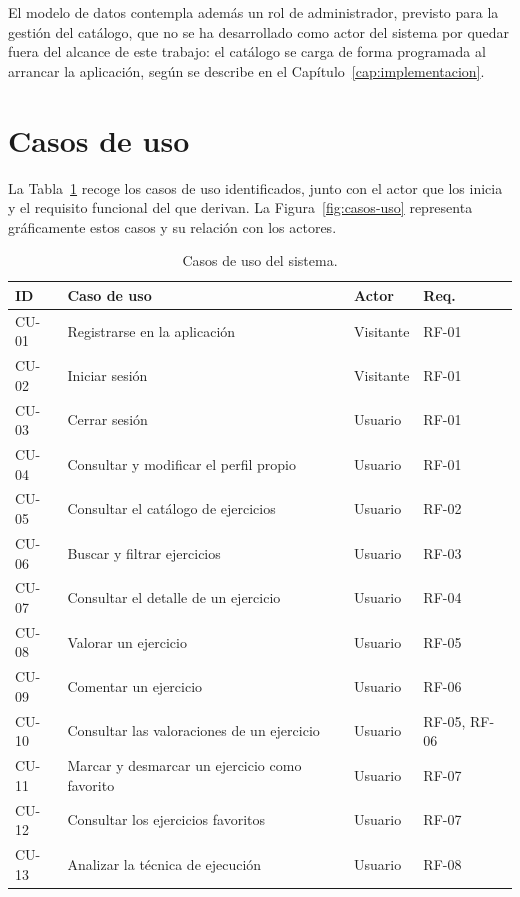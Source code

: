 \documentclass[12pt,a4paper,twoside,openright]{book}
\begin{document}
    El modelo de datos contempla además un rol de administrador, previsto para
    la gestión del catálogo, que no se ha desarrollado como actor del sistema
    por quedar fuera del alcance de este trabajo: el catálogo se carga de forma
    programada al arrancar la aplicación, según se describe en el
    Capítulo~\ref{cap:implementacion}.

    \section{Casos de uso}

    La Tabla~\ref{tab:casos-uso} recoge los casos de uso identificados, junto
    con el actor que los inicia y el requisito funcional del que derivan. La 
    Figura~\ref{fig:casos-uso} representa gráficamente estos casos y su relación con los actores.

    \begin{table}[htbp]
        \centering
        \small
        \begin{tabular}{l p{6.5cm} l l}
            \toprule
            \textbf{ID} & \textbf{Caso de uso} & \textbf{Actor} & \textbf{Req.} \\
            \midrule
            CU-01 & Registrarse en la aplicación            & Visitante & RF-01 \\
            CU-02 & Iniciar sesión                          & Visitante & RF-01 \\
            CU-03 & Cerrar sesión                           & Usuario   & RF-01 \\
            CU-04 & Consultar y modificar el perfil propio  & Usuario   & RF-01 \\
            CU-05 & Consultar el catálogo de ejercicios     & Usuario   & RF-02 \\
            CU-06 & Buscar y filtrar ejercicios             & Usuario   & RF-03 \\
            CU-07 & Consultar el detalle de un ejercicio    & Usuario   & RF-04 \\
            CU-08 & Valorar un ejercicio                    & Usuario   & RF-05 \\
            CU-09 & Comentar un ejercicio                   & Usuario   & RF-06 \\
            CU-10 & Consultar las valoraciones de un ejercicio & Usuario & RF-05, RF-06 \\
            CU-11 & Marcar y desmarcar un ejercicio como favorito & Usuario & RF-07 \\
            CU-12 & Consultar los ejercicios favoritos      & Usuario   & RF-07 \\
            CU-13 & Analizar la técnica de ejecución        & Usuario   & RF-08 \\
            \bottomrule
        \end{tabular}
        \caption{Casos de uso del sistema.}
        \label{tab:casos-uso}
    \end{table}
\end{document}
